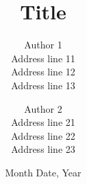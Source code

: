 \documentclass{article}
\begin{document}
\title{Title}
\author{Author 1\\
	Address line 11\\
	Address line 12\\
	Address line 13\\
	\and
	Author 2\\
	Address line 21\\
	Address line 22\\
	Address line 23\\
	}
\date{Month Date, Year}

\maketitle
\end{document}
